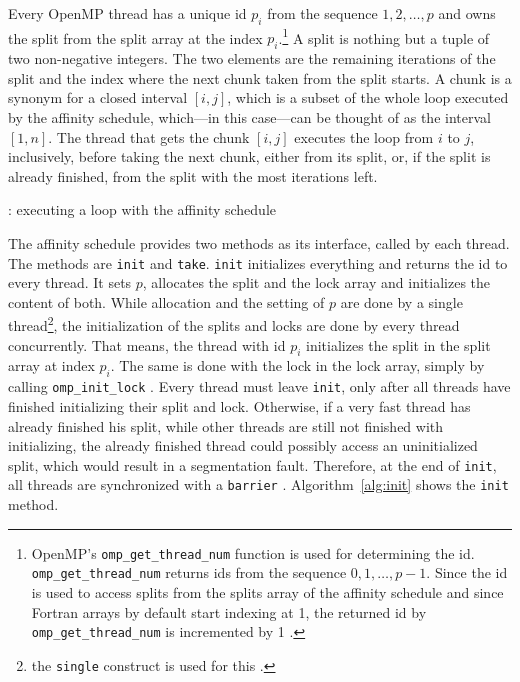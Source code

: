 \documentclass[twoside,11pt]{article}
\begin{document}
Every OpenMP thread has a unique id $p_i$ from the sequence
$1,2,\dots,p$ and owns the split from the split array at
the index $p_i$.\footnote{%
  OpenMP's \texttt{omp\_get\_thread\_num} function is used
  for determining the id.
  \texttt{omp\_get\_thread\_num} returns ids from the
  sequence $0,1,\dots,p-1$. Since the id is used to access
  splits from the splits array of the affinity schedule and
  since Fortran arrays by default start indexing at 1, the
  returned id by \texttt{omp\_get\_thread\_num} is
  incremented by 1 \citep[see][Chapter 3]{omp}.}
A split is nothing but a tuple of two non-negative
integers. The two elements are the remaining iterations of
the split and the index where the next chunk taken from the
split starts.
A chunk is a synonym for a closed interval $[i, j]$, which
is a subset of the whole loop executed by the affinity
schedule, which---in this case---can be thought of as the
interval $[1, n]$.
The thread that gets the chunk $[i, j]$ executes the loop
from $i$ to $j$, inclusively, before taking the next chunk,
either from its split, or, if the split is already
finished, from the split with the most iterations left.

\begin{algorithm}
  \caption{: executing a loop with the affinity schedule}
  \label{alg:main}

  \begin{algorithmic}[1]
      \ELSE
      \ENDIF
    \ENDWHILE
  \end{algorithmic}
\end{algorithm}

The affinity schedule provides two methods as its
interface, called by each thread.
The methods are \texttt{init} and \texttt{take}.
\texttt{init} initializes everything and returns the id
to every thread.
It sets $p$, allocates the split and the lock array and
initializes the content of both.
While allocation and the setting of $p$ are done by a
single thread\footnote{the \texttt{single} construct is
  used for this \citep[see][Chapter 2]{omp}.},
the initialization of the splits and locks
are done by every thread concurrently.
That means, the thread with id $p_i$ initializes the split
in the split array at index $p_i$.
The same is done with the lock in the lock array, simply
by calling \texttt{omp\_init\_lock}
\citep[see][Chapter 3]{omp}.
Every thread must leave \texttt{init}, only after all
threads have finished initializing their split and lock.
Otherwise, if a very fast thread has already finished his
split, while other threads are still not finished with
initializing, the already finished thread could possibly
access an uninitialized split, which would result in a
segmentation fault.
Therefore, at the end of \texttt{init}, all threads are
synchronized with a \texttt{barrier}
\citep[see][Chapter 2]{omp}.
Algorithm~\ref{alg:init} shows the \texttt{init} method.
\end{document}
